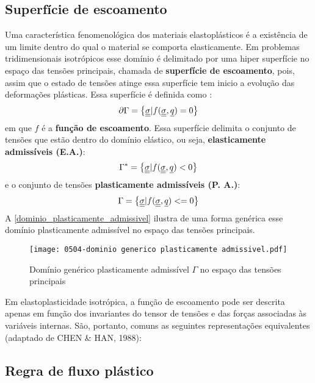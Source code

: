 \subsection{Superfície de escoamento}
Uma característica fenomenológica dos materiais elastoplásticos é a existência de um limite dentro do qual o material se comporta elasticamente. Em problemas tridimensionais isotrópicos esse domínio é delimitado por uma hiper superfície no espaço das tensões principais, chamada de \textbf{superfície de escoamento}, pois, assim que o estado de tensões atinge essa superfície tem inicio a evolução das deformações plásticas. Essa superfície é definida como \cite[p. 150]{Neto2008}:
\begin{equation}
	\label{eq:superficie_escoamento}
	\partial \Gamma = \left\{ \underline{\underline \sigma} | f(\underline{\underline \sigma},\underline q) = 0 \right\}
\end{equation}
em que $f$ é a \textbf{função de escoamento}. Essa superfície delimita o conjunto de tensões que estão dentro do domínio elástico, ou seja, \textbf{elasticamente admissíveis (E.A.)}:
\begin{equation}
	\label{eq:dominio_elasticamente_admissivel}
	\Gamma^* = \left\{ \underline{\underline \sigma} | f(\underline{\underline \sigma},\underline q) < 0 \right\}
\end{equation}
e o conjunto de tensões \textbf{plasticamente admissíveis (P. A.)}:
\begin{equation}
	\label{eq:dominio_plasticamente_admissivel}
	\Gamma = \left\{ \underline{\underline \sigma} | f(\underline{\underline \sigma},\underline q) <= 0 \right\}
\end{equation}
A \autoref{dominio_plasticamente_admissivel} ilustra de uma forma genérica esse domínio plasticamente admissível no espaço das tensões principais.
\begin{figure}[H]
	\begin{center}
		\texttt{[image: 0504-dominio generico plasticamente admissivel.pdf]}
	\end{center}
	\caption{\label{dominio_plasticamente_admissivel}Domínio genérico plasticamente admissível $\Gamma$ no espaço das tensões principais}
\end{figure}
Em elastoplasticidade isotrópica, a função de escoamento pode ser descrita apenas em função dos invariantes do tensor de tensões e das forças associadas às variáveis internas. São, portanto, comuns as seguintes representações equivalentes (adaptado de CHEN \& HAN, 1988):

\subsection{Regra de fluxo plástico}

